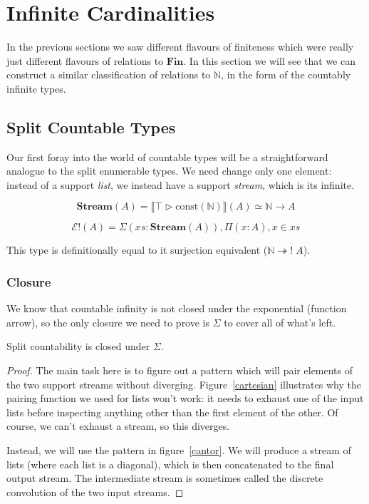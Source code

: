 \section{Infinite Cardinalities} \label{infinite-cardinalities}
In the previous sections we saw different flavours of finiteness which were
really just different flavours of relations to \(\mathbf{Fin}\).
In this section we will see that we can construct a similar classification of
relations to \(\mathbb{N}\), in the form of the countably infinite types.
\subsection{Split Countable Types}
Our first foray into the world of countable types will be a straightforward
analogue to the split enumerable types.
We need change only one element: instead of a support \emph{list}, we instead
have a support \emph{stream}, which is its infinite.
\begin{rm-definition}[Stream]
  \begin{equation}
    \mathbf{Stream}(A) = \llbracket \top \triangleright \text{const} (\mathbb{N}) \rrbracket(A) \simeq \mathbb{N} \rightarrow A
  \end{equation}
\end{rm-definition}
\begin{rm-definition}
  \begin{equation}
    \mathcal{E}!(A) = \Sigma {(\mathit{xs} : \mathbf{Stream}(A))} , \Pi {(x : A)} , x \in \mathit{xs}
  \end{equation}
\end{rm-definition}
This type is definitionally equal to it surjection equivalent (\(\mathbb{N}
\twoheadrightarrow ! \; A\)).
\subsubsection{Closure}
We know that countable infinity is not closed under the exponential (function
arrow), so the only closure we need to prove is \(\Sigma\) to cover all of
what's left.

\begin{rm-theorem} \label{split-countability-sigma}
  Split countability is closed under \(\Sigma\).
\end{rm-theorem}
\begin{proof}
  The main task here is to figure out a pattern which will pair elements of the
  two support streams without diverging.
  Figure~\ref{cartesian} illustrates why the pairing function we used for lists
  won't work: it needs to exhaust one of the input lists before inspecting
  anything other than the first element of the other.
  Of course, we can't exhaust a stream, so this diverges.

  Instead, we will use the pattern in figure~\ref{cantor}.
  We will produce a stream of lists (where each list is a diagonal), which is
  then concatenated to the final output stream.
  The intermediate stream is sometimes called the discrete convolution of the
  two input streams.
\end{proof}
